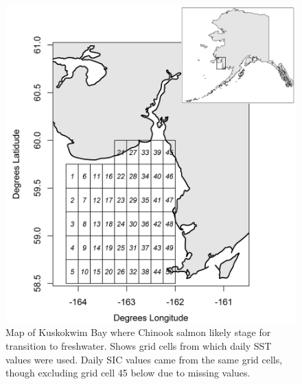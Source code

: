 \documentclass[12pt,]{book}
\theoremstyle{definition}
\theoremstyle{definition}
\theoremstyle{definition}
\theoremstyle{remark}
\begin{document}
\begin{figure}
  \centering
  \includegraphics{img/Ch2/map.png}
  \caption{Map of Kuskokwim Bay where Chinook salmon likely stage for transition to freshwater. Shows grid cells from which daily SST values were used. Daily SIC values came from the same grid cells, though excluding grid cell 45 below due to missing values.}
  \label{fig:ch2-map}
\end{figure}

\pagebreak
\end{document}
